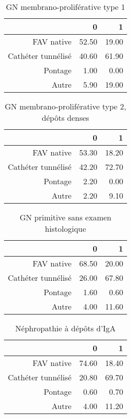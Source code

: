 \documentclass[11pt,a4paper]{article}\usepackage[]{graphicx}\usepackage[]{color}
\begin{document}
\begin{table}[H]
\centering
\begin{tabular}{rrr}
  \hline
 & 0 & 1 \\ 
  \hline
FAV native & 52.50 & 19.00 \\ 
  Cathéter tunnélisé & 40.60 & 61.90 \\ 
  Pontage & 1.00 & 0.00 \\ 
  Autre & 5.90 & 19.00 \\ 
   \hline
\end{tabular}
\caption{GN membrano-proliférative type 1} 
\end{table}
\begin{table}[H]
\centering
\begin{tabular}{rrr}
  \hline
 & 0 & 1 \\ 
  \hline
FAV native & 53.30 & 18.20 \\ 
  Cathéter tunnélisé & 42.20 & 72.70 \\ 
  Pontage & 2.20 & 0.00 \\ 
  Autre & 2.20 & 9.10 \\ 
   \hline
\end{tabular}
\caption{GN membrano-proliférative type 2, dépôts denses} 
\end{table}
\begin{table}[H]
\centering
\begin{tabular}{rrr}
  \hline
 & 0 & 1 \\ 
  \hline
FAV native & 68.50 & 20.00 \\ 
  Cathéter tunnélisé & 26.00 & 67.80 \\ 
  Pontage & 1.60 & 0.60 \\ 
  Autre & 4.00 & 11.60 \\ 
   \hline
\end{tabular}
\caption{GN primitive sans examen histologique} 
\end{table}
\begin{table}[H]
\centering
\begin{tabular}{rrr}
  \hline
 & 0 & 1 \\ 
  \hline
FAV native & 74.60 & 18.40 \\ 
  Cathéter tunnélisé & 20.80 & 69.70 \\ 
  Pontage & 0.60 & 0.70 \\ 
  Autre & 4.00 & 11.20 \\ 
   \hline
\end{tabular}
\caption{Néphropathie à dépôts d'IgA} 
\end{table}
\end{document}
